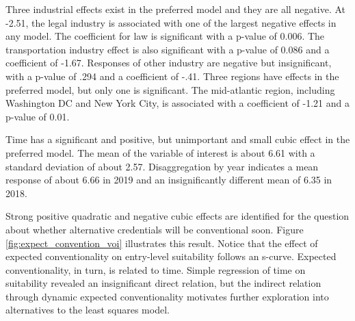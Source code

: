 \documentclass[AER]{./aea-latex-templates/AEA}
\begin{document}
        Three industrial effects exist in the preferred model and they are all negative.
        At -2.51, the legal industry is associated with one of the largest negative effects in any model.
        The coefficient for law is significant with a p-value of 0.006.
        The transportation industry effect is also significant with a p-value of 0.086 and a coefficient of -1.67.
        Responses of other industry are negative but insignificant, with a p-value of .294 and a coefficient of -.41.
        Three regions have effects in the preferred model, but only one is significant.
        The mid-atlantic region, including Washington DC and New York City, is associated with a coefficient of -1.21 and a p-value of 0.01.
        
        Time has a significant and positive, but unimportant and small cubic effect in the preferred model.
        The mean of the variable of interest is about 6.61 with a standard deviation of about 2.57.
        Disaggregation by year indicates a mean response of about 6.66 in 2019 and an insignificantly
        different mean of 6.35 in 2018.
        
        Strong positive quadratic and negative cubic effects are identified for
        the question about whether alternative credentials will be conventional soon.
        Figure \ref{fig:expect_convention_voi} illustrates this result. Notice that the effect of expected conventionality on entry-level suitability follows an s-curve.
        Expected conventionality, in turn, is related to time.
        Simple regression of time on suitability revealed an insignificant direct relation,
        but the indirect relation through dynamic expected conventionality motivates further exploration into alternatives to the least squares model.
        
\end{document}
